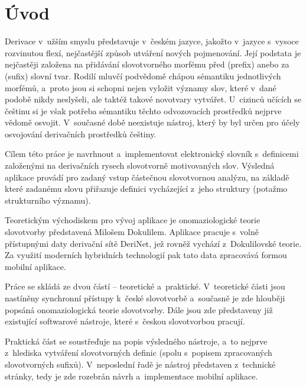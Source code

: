 \hypertarget{uxfavod}{%
\chapter*{Úvod}\label{uvod}
}

Derivace v~užším smyslu představuje v~českém jazyce, jakožto v~jazyce
s~vysoce rozvinutou flexí, nejčastější způsob utváření nových pojmenování.
Její podstata je nejčastěji založena na přidávání slovotvorného morfému
před (prefix) anebo za (sufix) slovní tvar. Rodilí mluvčí podvědomě
chápou sémantiku jednotlivých morfémů, a~proto jsou si schopni nejen
vyložit významy slov, které v~dané podobě nikdy neslyšeli, ale taktéž
takové novotvary vytvářet. U~cizinců učících se češtinu si je však
potřeba sémantiku těchto odvozovacích prostředků nejprve vědomě osvojit.
V~současné době neexistuje nástroj, který by byl určen pro účely
osvojování derivačních prostředků češtiny.

Cílem této práce je navrhnout a~implementovat elektronický slovník
s~definicemi založenými na derivačních rysech slovotvorně motivovaných
slov. Výsledná aplikace provádí pro zadaný vstup částečnou slovotvornou
analýzu, na základě které zadanému slovu přiřazuje definici vycházející
z~jeho struktury (potažmo strukturního významu).

Teoretickým východiskem pro vývoj aplikace je onomaziologické teorie
slovotvorby představená Milošem Dokulilem. Aplikace pracuje s~volně
přístupnými daty derivační sítě DeriNet, jež rovněž vychází
z~Dokulilovské teorie. Za využití moderních hybridních technologií pak
tato data zpracovává formou mobilní aplikace.

Práce se skládá ze dvou částí -- teoretické a~praktické. V~teoretické
části jsou nastíněny synchronní přístupy k~české slovotvorbě a~současně
je zde hlouběji popsáná onomaziologická teorie slovotvorby. Dále jsou
zde představeny již existující softwarové nástroje, které s~českou
slovotvorbou pracují.

Praktická část se soustřeďuje na popis výsledného nástroje, a~to nejprve
z~hlediska vytváření slovotvorných definic (spolu s~popisem zpracovaných
slovotvorných sufixů). V~neposlední řadě je nástroj představen
z~technické stránky, tedy je zde rozebrán návrh a~implementace mobilní
aplikace.
